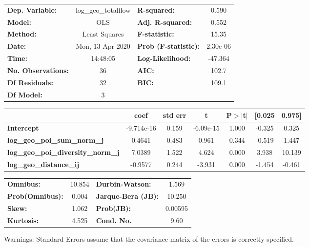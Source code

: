 \begin{center}
\begin{tabular}{lclc}
\toprule
\textbf{Dep. Variable:}                    & log\_geo\_totalflow & \textbf{  R-squared:         } &     0.590   \\
\textbf{Model:}                            &         OLS         & \textbf{  Adj. R-squared:    } &     0.552   \\
\textbf{Method:}                           &    Least Squares    & \textbf{  F-statistic:       } &     15.35   \\
\textbf{Date:}                             &   Mon, 13 Apr 2020  & \textbf{  Prob (F-statistic):} &  2.30e-06   \\
\textbf{Time:}                             &       14:48:05      & \textbf{  Log-Likelihood:    } &   -47.364   \\
\textbf{No. Observations:}                 &            36       & \textbf{  AIC:               } &     102.7   \\
\textbf{Df Residuals:}                     &            32       & \textbf{  BIC:               } &     109.1   \\
\textbf{Df Model:}                         &             3       & \textbf{                     } &             \\
\bottomrule
\end{tabular}
\begin{tabular}{lcccccc}
                                           & \textbf{coef} & \textbf{std err} & \textbf{t} & \textbf{P$> |$t$|$} & \textbf{[0.025} & \textbf{0.975]}  \\
\midrule
\textbf{Intercept}                         &   -9.714e-16  &        0.159     & -6.09e-15  &         1.000        &       -0.325    &        0.325     \\
\textbf{log\_geo\_poi\_sum\_norm\_j}       &       0.4641  &        0.483     &     0.961  &         0.344        &       -0.519    &        1.447     \\
\textbf{log\_geo\_poi\_diversity\_norm\_j} &       7.0389  &        1.522     &     4.624  &         0.000        &        3.938    &       10.139     \\
\textbf{log\_geo\_distance\_ij}            &      -0.9577  &        0.244     &    -3.931  &         0.000        &       -1.454    &       -0.461     \\
\bottomrule
\end{tabular}
\begin{tabular}{lclc}
\textbf{Omnibus:}       & 10.854 & \textbf{  Durbin-Watson:     } &    1.569  \\
\textbf{Prob(Omnibus):} &  0.004 & \textbf{  Jarque-Bera (JB):  } &   10.250  \\
\textbf{Skew:}          &  1.062 & \textbf{  Prob(JB):          } &  0.00595  \\
\textbf{Kurtosis:}      &  4.525 & \textbf{  Cond. No.          } &     9.60  \\
\bottomrule
\end{tabular}
\end{center}

Warnings: \newline
 [1] Standard Errors assume that the covariance matrix of the errors is correctly specified.